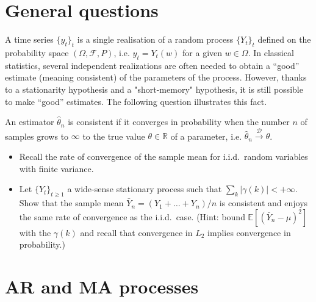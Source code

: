 \documentclass[11pt]{article}
\begin{document}
\section{General questions}

A time series $\{y_t\}_t$ is a single realisation of a random process $\{Y_t\}_t$ defined on the probability space $(\Omega, \mathcal{F}, P)$, i.e. $y_t = Y_t(w)$ for a given $w\in\Omega$.
In classical statistics, several independent realizations are often needed to obtain a ``good'' estimate (meaning consistent) of the parameters of the process.
However, thanks to a stationarity hypothesis and a "short-memory" hypothesis, it is still possible to make ``good'' estimates.
The following question illustrates this fact.

\begin{exercise}
An estimator $\hat{\theta}_n$ is consistent if it converges in probability when the number $n$ of samples grows to $\infty$ to the true value $\theta\in\mathbb{R}$ of a parameter, i.e. $\hat{\theta}_n \xrightarrow{\mathcal{D}} \theta$.

\begin{itemize}
    \item Recall the rate of convergence of the sample mean for i.i.d.\ random variables with finite variance.
    \item Let $\{Y_t\}_{t\geq 1}$ a wide-sense stationary process such that $\sum_k |\gamma (k)| < +\infty$. 
    Show that the sample mean $\bar{Y}_n = (Y_1+\dots+Y_n)/n$ is consistent and enjoys the same rate of convergence as the i.i.d.\ case. (Hint: bound $\mathbb{E}[(\bar{Y}_n-\mu)^2]$ with the $\gamma (k)$ and recall that convergence in $L_2$ implies convergence in probability.)
\end{itemize}

\end{exercise}

\begin{solution}  %


\end{solution}


\newpage
\section{AR and MA processes}
\end{document}
